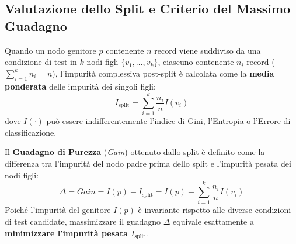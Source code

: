 \FloatBarrier
\subsection{Valutazione dello Split e Criterio del Massimo Guadagno}
\label{subsec:dm-split-evaluation}

Quando un nodo genitore $p$ contenente $n$ record viene suddiviso da una condizione di test in $k$ nodi figli $\{v_1, \dots, v_k\}$, ciascuno contenente $n_i$ record ($\sum_{i=1}^k n_i = n$), l'impurità complessiva post-split è calcolata come la \textbf{media ponderata} delle impurità dei singoli figli:
\begin{equation}
    I_{\text{split}} = \sum_{i=1}^k \frac{n_i}{n} I(v_i)
\end{equation}
dove $I(\cdot)$ può essere indifferentemente l'indice di Gini, l'Entropia o l'Errore di classificazione.

Il \textbf{Guadagno di Purezza} (\textit{Gain}) ottenuto dallo split è definito come la differenza tra l'impurità del nodo padre prima dello split e l'impurità pesata dei nodi figli:
\begin{equation}
    \Delta = Gain = I(p) - I_{\text{split}} = I(p) - \sum_{i=1}^k \frac{n_i}{n} I(v_i)
\end{equation}
Poiché l'impurità del genitore $I(p)$ è invariante rispetto alle diverse condizioni di test candidate, massimizzare il guadagno $\Delta$ equivale esattamente a \textbf{minimizzare l'impurità pesata $I_{\text{split}}$}.

